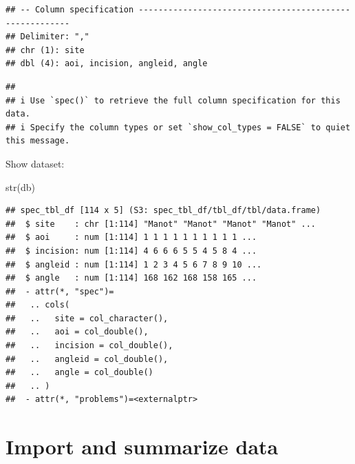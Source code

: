 \documentclass[
]{article}
\newenvironment{Shaded}{\begin{snugshade}}{\end{snugshade}}
\newcommand{\AttributeTok}[1]{\textcolor[rgb]{0.77,0.63,0.00}{#1}}
\newcommand{\ConstantTok}[1]{\textcolor[rgb]{0.00,0.00,0.00}{#1}}
\newcommand{\FunctionTok}[1]{\textcolor[rgb]{0.00,0.00,0.00}{#1}}
\newcommand{\NormalTok}[1]{#1}
\newcommand{\OtherTok}[1]{\textcolor[rgb]{0.56,0.35,0.01}{#1}}
\newcommand{\SpecialCharTok}[1]{\textcolor[rgb]{0.00,0.00,0.00}{#1}}
\newcommand{\StringTok}[1]{\textcolor[rgb]{0.31,0.60,0.02}{#1}}
\begin{document}
\begin{verbatim}
## -- Column specification --------------------------------------------------------
## Delimiter: ","
## chr (1): site
## dbl (4): aoi, incision, angleid, angle
\end{verbatim}

\begin{verbatim}
## 
## i Use `spec()` to retrieve the full column specification for this data.
## i Specify the column types or set `show_col_types = FALSE` to quiet this message.
\end{verbatim}

\begin{Shaded}
\end{Shaded}

Show dataset:

\begin{Shaded}
\begin{Highlighting}[]
\FunctionTok{str}\NormalTok{(db)}
\end{Highlighting}
\end{Shaded}

\begin{verbatim}
## spec_tbl_df [114 x 5] (S3: spec_tbl_df/tbl_df/tbl/data.frame)
##  $ site    : chr [1:114] "Manot" "Manot" "Manot" "Manot" ...
##  $ aoi     : num [1:114] 1 1 1 1 1 1 1 1 1 1 ...
##  $ incision: num [1:114] 4 6 6 6 5 5 4 5 8 4 ...
##  $ angleid : num [1:114] 1 2 3 4 5 6 7 8 9 10 ...
##  $ angle   : num [1:114] 168 162 168 158 165 ...
##  - attr(*, "spec")=
##   .. cols(
##   ..   site = col_character(),
##   ..   aoi = col_double(),
##   ..   incision = col_double(),
##   ..   angleid = col_double(),
##   ..   angle = col_double()
##   .. )
##  - attr(*, "problems")=<externalptr>
\end{verbatim}

\hypertarget{import-and-summarize-data}{%
\section{Import and summarize data}\label{import-and-summarize-data}}
\end{document}
